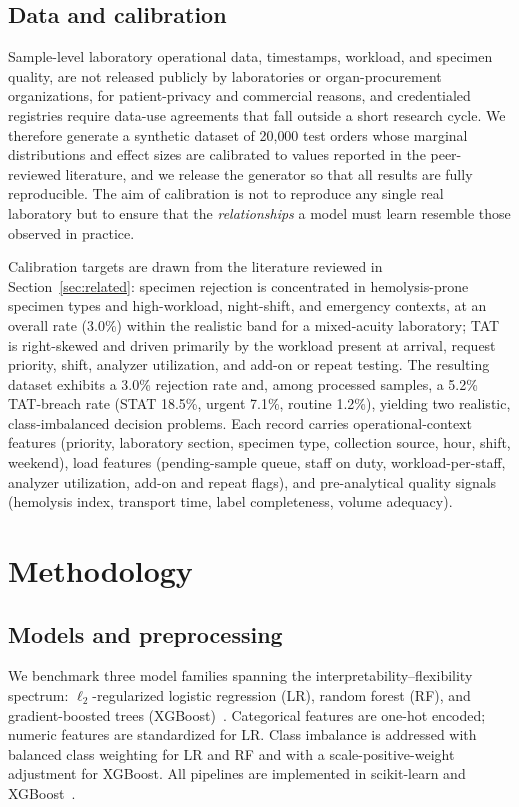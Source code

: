 \documentclass[journal]{IEEEtran}
\begin{document}
\subsection{Data and calibration}
Sample-level laboratory operational data, timestamps, workload, and specimen
quality, are not released publicly by laboratories or organ-procurement
organizations, for patient-privacy and commercial reasons, and credentialed
registries require data-use agreements that fall outside a short research cycle.
We therefore generate a synthetic dataset of 20{,}000 test orders whose marginal
distributions and effect sizes are calibrated to values reported in the
peer-reviewed literature, and we release the generator so that all results are
fully reproducible. The aim of calibration is not to reproduce any single real
laboratory but to ensure that the \emph{relationships} a model must learn resemble
those observed in practice.

Calibration targets are drawn from the literature reviewed in
Section~\ref{sec:related}: specimen rejection is concentrated in hemolysis-prone
specimen types and high-workload, night-shift, and emergency contexts, at an
overall rate (3.0\%) within the realistic band for a mixed-acuity laboratory; TAT
is right-skewed and driven primarily by the workload present at arrival, request
priority, shift, analyzer utilization, and add-on or repeat testing. The resulting
dataset exhibits a 3.0\% rejection rate and, among processed samples, a 5.2\%
TAT-breach rate (STAT 18.5\%, urgent 7.1\%, routine 1.2\%), yielding two realistic,
class-imbalanced decision problems. Each record carries operational-context
features (priority, laboratory section, specimen type, collection source, hour,
shift, weekend), load features (pending-sample queue, staff on duty,
workload-per-staff, analyzer utilization, add-on and repeat flags), and
pre-analytical quality signals (hemolysis index, transport time, label
completeness, volume adequacy).

\section{Methodology}\label{sec:method}

\subsection{Models and preprocessing}
We benchmark three model families spanning the interpretability--flexibility
spectrum: $\ell_2$-regularized logistic regression (LR), random forest (RF), and
gradient-boosted trees (XGBoost)~\cite{breiman2001,xgboost2016}. Categorical
features are one-hot encoded; numeric features are standardized for LR.
Class imbalance is addressed with balanced class weighting for LR and RF and with
a scale-positive-weight adjustment for XGBoost. All pipelines are implemented in
scikit-learn and XGBoost~\cite{sklearn2011}.
\end{document}

